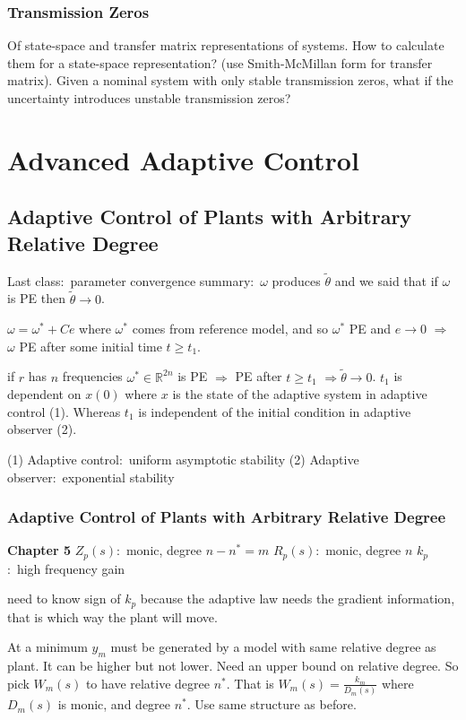 \subsection{Transmission Zeros}

Of state-space and transfer matrix representations of systems.
How to calculate them for a state-space representation? (use Smith-McMillan form for transfer matrix).
Given a nominal system with only stable transmission zeros, what if the uncertainty introduces unstable transmission zeros?

\chapter{Advanced Adaptive Control}

\section{Adaptive Control of Plants with Arbitrary Relative Degree}

Last class:\ parameter convergence
summary:\ $\omega$ produces $\tilde{\theta}$ and we said that if $\omega$ is PE then $\tilde{\theta}\rightarrow0$.

$\omega=\omega^{*}+Ce$ where $\omega^{*}$ comes from reference model, and so $\omega^{*}$ PE and $e\rightarrow0$ $\Rightarrow$ $\omega$ PE after some initial time $t\geq t_{1}$.

if $r$ has $n$ frequencies $\omega^{*}\in\mathbb{R}^{2n}$ is PE $\Rightarrow$ PE after $t\geq t_{1}$ $\Rightarrow\tilde{\theta}\rightarrow0$.
$t_{1}$ is dependent on $x(0)$ where $x$ is the state of the adaptive system in adaptive control (1).
Whereas $t_{1}$ is independent of the initial condition in adaptive observer (2).

(1) Adaptive control:\ uniform asymptotic stability
(2) Adaptive observer:\ exponential stability

\subsection{Adaptive Control of Plants with Arbitrary Relative Degree}

\textbf{Chapter 5}
$Z_{p}(s)$:\ monic, degree $n-n^{*}=m$
$R_{p}(s)$:\ monic, degree $n$
$k_{p}$:\ high frequency gain

need to know sign of $k_{p}$ because the adaptive law needs the gradient information, that is which way the plant will move.

At a minimum $y_{m}$ must be generated by a model with same relative degree as plant.
It can be higher but not lower.
Need an upper bound on relative degree.
So pick $W_{m}(s)$ to have relative degree $n^{*}$.
That is $W_{m}(s)=\frac{k_{m}}{D_{m}(s)}$ where $D_{m}(s)$ is monic, and degree $n^{*}$.
Use same structure as before.

